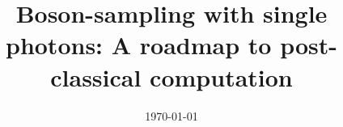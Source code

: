 \documentclass[aps,rmp,twocolumn,amsmath,amssymb,nofootinbib,superscriptaddress]{revtex4}
\begin{document}


%
%

\title{Boson-sampling with single photons: A roadmap to post-classical computation}

%
%


\date{\today}

\frenchspacing

%
%

\begin{abstract}
\end{abstract}

\maketitle

\tableofcontents

%
%

\begin{acknowledgments}
\end{acknowledgments}

%
%


\end{document}
